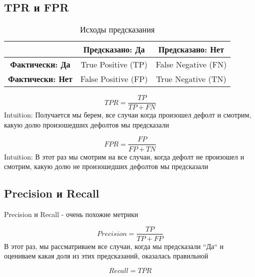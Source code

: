 \documentclass{article}
\begin{document}
        \subsection{TPR и FPR}
            \begin{table}[h] %
                \centering %
                \caption{Исходы предсказания} %
                \begin{tabular}{|c|c|c|}
                    \hline
                    & \textbf{Предсказано: Да} & \textbf{Предсказано: Нет} \\ \hline
                    \textbf{Фактически: Да} & True Positive (TP) & False Negative (FN) \\ \hline
                    \textbf{Фактически: Нет} & False Positive (FP) & True Negative (TN) \\ \hline
                \end{tabular}
            \end{table}
    
            \begin{equation}
                TPR = \dfrac{TP}{TP + FN}
            \end{equation}
            Intuition: Получается мы берем, все случаи когда произошел дефолт и смотрим, какую
            долю произошедших дефолтов мы предсказали
    
            \begin{equation}
                FPR = \dfrac{FP}{FP + TN}
            \end{equation}
            Intuition: В этот раз мы смотрим на все случаи, когда дефолт не произошел и смотрим, какую долю
            не произошедших дефолтов мы предсказали
    
        \subsection{Precision и Recall}
            Precision и Recall - очень похожие метрики

            \begin{equation}
                Precision = \dfrac{TP}{TP + FP}
            \end{equation}
            В этот раз, мы рассматриваем все случаи, когда мы предсказали ``Да`` и оцениваем какая доля из этих предсказаний, оказалась правильной

            \begin{equation}
                Recall = TPR
            \end{equation}
    
\end{document}
